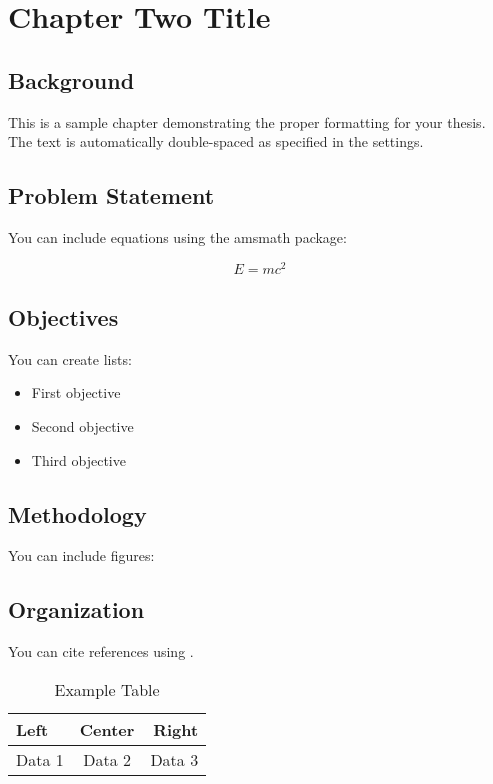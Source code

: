 \chapter{Chapter Two Title}

\section{Background}
This is a sample chapter demonstrating the proper formatting for your thesis.
The text is automatically double-spaced as specified in the settings.

\section{Problem Statement}
You can include equations using the amsmath package:

\begin{equation}
    E = mc^2
\end{equation}

\section{Objectives}
You can create lists:

\begin{itemize}
    \item First objective
    \item Second objective
    \item Third objective
\end{itemize}

\section{Methodology}
You can include figures:


\section{Organization}
You can cite references using \cite{reference-key}.

\begin{table}[htbp]
    \centering
    \caption{Example Table}
    \label{tab:example}
    \begin{tabular}{|l|c|r|}
        \hline
        Left & Center & Right \\
        \hline
        Data 1 & Data 2 & Data 3 \\
        \hline
    \end{tabular}
\end{table} 
